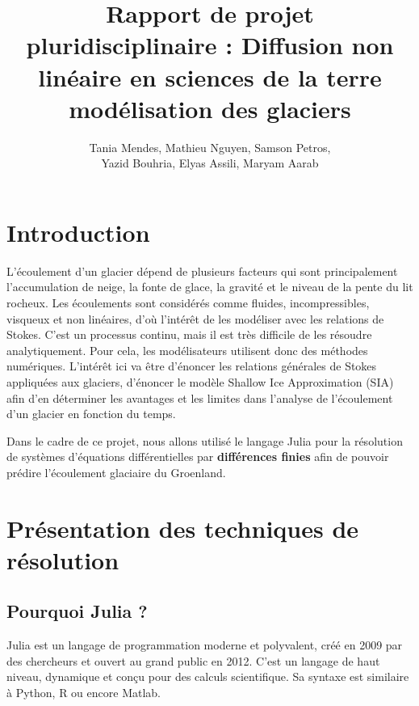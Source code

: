 \documentclass{article}
\title{\vspace{\fill}\textbf{ Rapport de projet pluridisciplinaire :} \newline Diffusion non linéaire en sciences de la terre modélisation des glaciers\vspace{\fill}}
\author{Tania Mendes, Mathieu Nguyen, Samson Petros,\\ Yazid Bouhria, Elyas Assili, Maryam Aarab}
\affil{\textbf{Encadrante} : Laetitia Le Pourhiet}
\begin{document}
\maketitle 

\newpage

\tableofcontents

\newpage
\section*{Introduction}

L’écoulement d’un glacier dépend de plusieurs facteurs qui sont principalement l’accumulation de neige, la fonte de glace, la gravité et le niveau de la pente du lit rocheux.
Les écoulements sont considérés comme fluides, incompressibles, visqueux et non linéaires, d’où l’intérêt de les modéliser avec les relations de Stokes.
\newline
C'est un processus continu, mais il est très difficile de les résoudre analytiquement. Pour cela, les modélisateurs utilisent donc des méthodes numériques.
L’intérêt ici va être d’énoncer les relations générales de Stokes appliquées aux glaciers, d’énoncer le modèle Shallow Ice Approximation (SIA) afin d’en déterminer les avantages et les limites dans l’analyse de l’écoulement d’un glacier en fonction du temps.


Dans le cadre de ce projet, nous allons utilisé le langage Julia pour la résolution de systèmes d'équations différentielles par \textbf{différences finies} afin de pouvoir prédire l'écoulement glaciaire du Groenland.


\section{Présentation des techniques de résolution}

\subsection{Pourquoi Julia ?}

Julia est un langage de programmation moderne et polyvalent, créé en 2009 par des chercheurs et ouvert au grand public en 2012. C'est un langage de haut niveau, dynamique et conçu pour des calculs scientifique. Sa syntaxe est similaire à Python, R ou encore Matlab.
 
\end{document}
